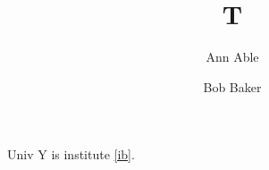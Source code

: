 \documentclass{aa}
\begin{document}
\title{T}
\author{Ann Able\inst{\ref{ia},\ref{ib}} \and Bob Baker\inst{\ref{ib}}}
\maketitle
Univ Y is institute \ref{ib}.
\end{document}
